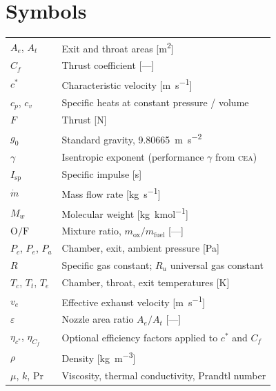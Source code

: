 \documentclass[11pt,a4paper]{report}
\newcommand{\cea}{\textsc{cea}}
\newcommand{\of}{\mathrm{O/F}}
\newcommand{\Isp}{I_{\mathrm{sp}}}
\newcommand{\cstar}{c^{*}}
\newcommand{\Cf}{C_{f}}
\newcommand{\ve}{v_{e}}
\newcommand{\Pc}{P_{c}}
\newcommand{\Pe}{P_{e}}
\newcommand{\Pa}{P_{a}}
\newcommand{\eps}{\varepsilon}
\newcommand{\gzero}{g_{0}}
\begin{document}
\section*{Symbols}
\begin{longtable}{@{}p{2.4cm}p{11.5cm}@{}}
$A_e$, $A_t$ & Exit and throat areas [\si{\metre\squared}] \\
$\Cf$ & Thrust coefficient [---] \\
$\cstar$ & Characteristic velocity [\si{\metre\per\second}] \\
$c_p$, $c_v$ & Specific heats at constant pressure / volume \\
$F$ & Thrust [\si{\newton}] \\
$\gzero$ & Standard gravity, \SI{9.80665}{\metre\per\second\squared} \\
$\gamma$ & Isentropic exponent (performance $\gamma$ from \cea{}) \\
$\Isp$ & Specific impulse [\si{\second}] \\
$\dot{m}$ & Mass flow rate [\si{\kilogram\per\second}] \\
$M_w$ & Molecular weight [\si{\kilogram\per\kilo\mole}] \\
$\of$ & Mixture ratio, $m_{\mathrm{ox}}/m_{\mathrm{fuel}}$ [---] \\
$\Pc$, $\Pe$, $\Pa$ & Chamber, exit, ambient pressure [\si{\pascal}] \\
$R$ & Specific gas constant; $R_u$ universal gas constant \\
$T_c$, $T_t$, $T_e$ & Chamber, throat, exit temperatures [\si{\kelvin}] \\
$\ve$ & Effective exhaust velocity [\si{\metre\per\second}] \\
$\eps$ & Nozzle area ratio $A_e/A_t$ [---] \\
$\eta_{c^{*}}$, $\eta_{\Cf}$ & Optional efficiency factors applied to $\cstar$ and $\Cf$ \\
$\rho$ & Density [\si{\kilogram\per\metre\cubed}] \\
$\mu$, $k$, $\mathrm{Pr}$ & Viscosity, thermal conductivity, Prandtl number \\
\end{longtable}
\end{document}
